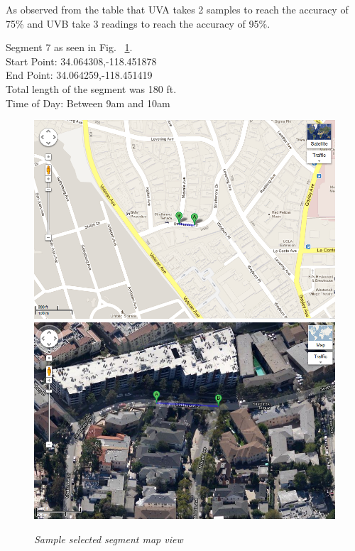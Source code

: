 \documentclass[12pt,fullpage,doublespace]{article}
\begin{document}
As observed from the table that UVA takes 2 samples to reach the accuracy of 75\% and UVB take 3 readings to reach the accuracy of 95\%. 
\newpage\newpage
\begin{center}
Segment 7 as seen in Fig. ~\ref{fig:segment7}. \\
Start Point:  34.064308,-118.451878\\
End Point:  34.064259,-118.451419\\
Total length of the segment was 180 ft.\\
Time of Day: Between 9am and 10am\\
\begin{figure}[h]
\begin{center}
\includegraphics[scale=0.32]{segment7a.png}
\includegraphics[scale=0.32]{segment7b.png}
\caption{\small \sl Sample selected segment map view}\label{fig:segment7}
\end{center}
\end{figure}
\end{center}
\end{document}
